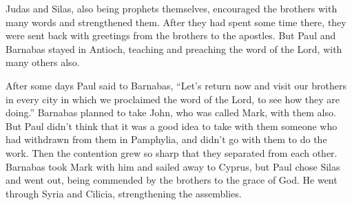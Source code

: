 {Judas and Silas, also being prophets themselves, encouraged the brothers with many words and strengthened them.
After they had spent some time there, they were sent back with greetings from the brothers to the apostles.
But Paul and Barnabas stayed in Antioch, teaching and preaching the word of the Lord, with many others also.
\par }{\PP {}After some days Paul said to Barnabas, “Let’s return now and visit our brothers in every city in which we proclaimed the word of the Lord, to see how they are doing.”
Barnabas planned to take John, who was called Mark, with them also.
But Paul didn’t think that it was a good idea to take with them someone who had withdrawn from them in Pamphylia, and didn’t go with them to do the work.
Then the contention grew so sharp that they separated from each other. Barnabas took Mark with him and sailed away to Cyprus,
but Paul chose Silas and went out, being commended by the brothers to the grace of God.
He went through Syria and Cilicia, strengthening the assemblies.

}
